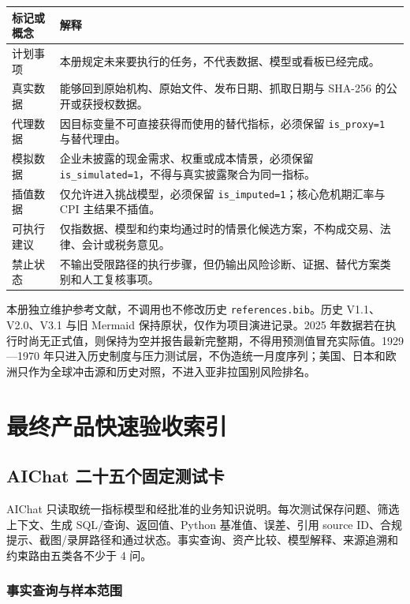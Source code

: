 \documentclass[UTF8,fontset=windows,12pt,openany]{ctexbook}
\newcommand{\Field}[1]{{\small\nolinkurl{#1}}}
\newcommand{\File}[1]{{\small\nolinkurl{#1}}}
\begin{document}
\begin{longtable}{p{3.0cm}p{10.5cm}}
\toprule
\textbf{标记或概念} & \textbf{解释}\\
\midrule
计划事项 & 本册规定未来要执行的任务，不代表数据、模型或看板已经完成。\\
真实数据 & 能够回到原始机构、原始文件、发布日期、抓取日期与 SHA-256 的公开或获授权数据。\\
代理数据 & 因目标变量不可直接获得而使用的替代指标，必须保留 \Field{is_proxy=1} 与替代理由。\\
模拟数据 & 企业未披露的现金需求、权重或成本情景，必须保留 \Field{is_simulated=1}，不得与真实披露聚合为同一指标。\\
插值数据 & 仅允许进入挑战模型，必须保留 \Field{is_imputed=1}；核心危机期汇率与 CPI 主结果不插值。\\
可执行建议 & 仅指数据、模型和约束均通过时的情景化候选方案，不构成交易、法律、会计或税务意见。\\
禁止状态 & 不输出受限路径的执行步骤，但仍输出风险诊断、证据、替代方案类别和人工复核事项。\\
\bottomrule
\end{longtable}

本册独立维护参考文献，不调用也不修改历史 \File{references.bib}。历史 V1.1、V2.0、V3.1 与旧 Mermaid 保持原状，仅作为项目演进记录。2025 年数据若在执行时尚无正式值，则保持为空并报告最新完整期，不得用预测值冒充实际值。1929—1970 年只进入历史制度与压力测试层，不伪造统一月度序列；美国、日本和欧洲只作为全球冲击源和历史对照，不进入亚非拉国别风险排名。

\tableofcontents
\listoftables

\mainmatter
\part{最终产品快速验收索引}

\chapter{AIChat 二十五个固定测试卡}

AIChat 只读取统一指标模型和经批准的业务知识说明。每次测试保存问题、筛选上下文、生成 SQL/查询、返回值、Python 基准值、误差、引用 source ID、合规提示、截图/录屏路径和通过状态。事实查询、资产比较、模型解释、来源追溯和约束路由五类各不少于 4 问。

\section{事实查询与样本范围}
\end{document}
